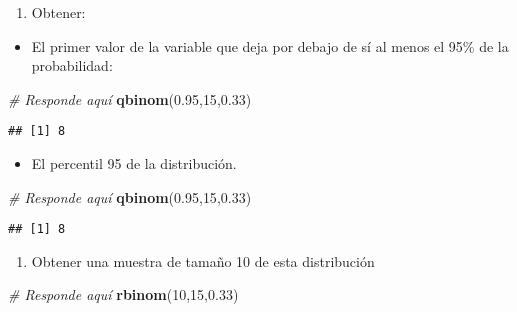 \documentclass[
]{article}
\newenvironment{Shaded}{\begin{snugshade}}{\end{snugshade}}
\newcommand{\CommentTok}[1]{\textcolor[rgb]{0.56,0.35,0.01}{\textit{#1}}}
\newcommand{\DecValTok}[1]{\textcolor[rgb]{0.00,0.00,0.81}{#1}}
\newcommand{\FloatTok}[1]{\textcolor[rgb]{0.00,0.00,0.81}{#1}}
\newcommand{\KeywordTok}[1]{\textcolor[rgb]{0.13,0.29,0.53}{\textbf{#1}}}
\newcommand{\NormalTok}[1]{#1}
\providecommand{\tightlist}{%
  \setlength{\itemsep}{0pt}\setlength{\parskip}{0pt}}
\begin{document}
\begin{enumerate}
\def\labelenumi{\arabic{enumi}.}
\setcounter{enumi}{1}
\tightlist
\item
  Obtener:
\end{enumerate}

\begin{itemize}
\tightlist
\item
  El primer valor de la variable que deja por debajo de sí al menos el
  95\% de la probabilidad:
\end{itemize}

\begin{Shaded}
\begin{Highlighting}[]
\CommentTok{# Responde aquí}
\KeywordTok{qbinom}\NormalTok{(}\FloatTok{0.95}\NormalTok{,}\DecValTok{15}\NormalTok{,}\FloatTok{0.33}\NormalTok{)}
\end{Highlighting}
\end{Shaded}

\begin{verbatim}
## [1] 8
\end{verbatim}

\begin{itemize}
\tightlist
\item
  El percentil 95 de la distribución.
\end{itemize}

\begin{Shaded}
\begin{Highlighting}[]
\CommentTok{# Responde aquí}
\KeywordTok{qbinom}\NormalTok{(}\FloatTok{0.95}\NormalTok{,}\DecValTok{15}\NormalTok{,}\FloatTok{0.33}\NormalTok{)}
\end{Highlighting}
\end{Shaded}

\begin{verbatim}
## [1] 8
\end{verbatim}

\begin{enumerate}
\def\labelenumi{\arabic{enumi}.}
\setcounter{enumi}{2}
\tightlist
\item
  Obtener una muestra de tamaño 10 de esta distribución
\end{enumerate}

\begin{Shaded}
\begin{Highlighting}[]
\CommentTok{# Responde aquí}
\KeywordTok{rbinom}\NormalTok{(}\DecValTok{10}\NormalTok{,}\DecValTok{15}\NormalTok{,}\FloatTok{0.33}\NormalTok{)}
\end{Highlighting}
\end{Shaded}
\end{document}
